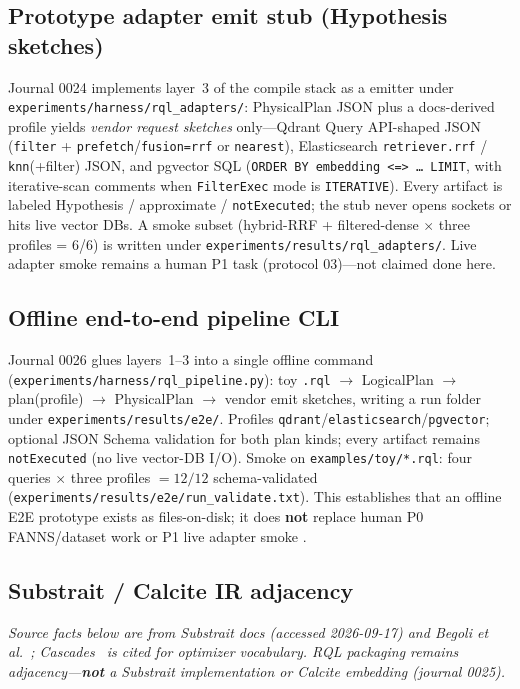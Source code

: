 \subsection{Prototype adapter emit stub (Hypothesis sketches)}
\label{sec:adapter-emit-stub}
Journal 0024 implements layer~3 of the compile stack as a \hypothesis{} emitter under \texttt{experiments/harness/rql\_adapters/}: PhysicalPlan JSON plus a docs-derived profile yields \emph{vendor request sketches} only---Qdrant Query API-shaped JSON (\texttt{filter} + \texttt{prefetch}/\texttt{fusion=rrf} or \texttt{nearest}), Elasticsearch \texttt{retriever.rrf} / \texttt{knn}(+filter) JSON, and pgvector SQL (\texttt{ORDER BY embedding <=> \ldots\ LIMIT}, with iterative-scan comments when \texttt{FilterExec} mode is \texttt{ITERATIVE}).
Every artifact is labeled Hypothesis / approximate / \texttt{notExecuted}; the stub never opens sockets or hits live vector DBs.
A smoke subset (hybrid-RRF + filtered-dense $\times$ three profiles = 6/6) is written under \texttt{experiments/results/rql\_adapters/}.
Live adapter smoke remains a human P1 task (protocol 03)---not claimed done here.

\subsection{Offline end-to-end pipeline CLI}
\label{sec:e2e-pipeline}
Journal 0026 glues layers~1--3 into a single offline command (\texttt{experiments/harness/rql\_pipeline.py}): toy \texttt{.rql} $\rightarrow$ LogicalPlan $\rightarrow$ plan(profile) $\rightarrow$ PhysicalPlan $\rightarrow$ vendor emit sketches, writing a run folder under \texttt{experiments/results/e2e/}.
Profiles \texttt{qdrant}/\texttt{elasticsearch}/\texttt{pgvector}; optional JSON Schema validation for both plan kinds; every artifact remains \texttt{notExecuted} (no live vector-DB I/O).
Smoke on \texttt{examples/toy/*.rql}: four queries $\times$ three profiles $= 12/12$ schema-validated (\texttt{experiments/results/e2e/run\_validate.txt}).
This establishes that an offline E2E prototype exists as files-on-disk; it does \textbf{not} replace human P0 FANNS/dataset work or P1 live adapter smoke \hypothesis{}.

\subsection{Substrait / Calcite IR adjacency}
\label{sec:substrait-calcite-adjacency}
\noindent\textit{Source facts below are \established{} from Substrait docs (accessed 2026-09-17) and Begoli et al.~\citep{begoli2018calcite}; Cascades~\citep{graefe1995cascades} is cited for optimizer vocabulary.
RQL packaging remains \hypothesis{} adjacency---\textbf{not} a Substrait implementation or Calcite embedding (journal 0025).}

